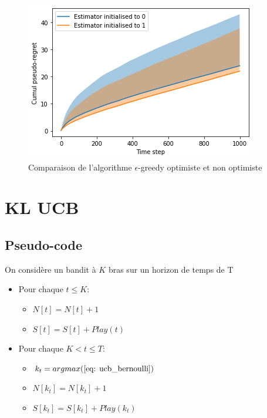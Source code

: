 \documentclass[letterpaper,11pt]{article}
\begin{document}
\begin{figure}[H]
\label{fig: no1_2}
\begin{center}
\caption{Comparaison de l'algorithme $\epsilon$-greedy optimiste et non optimiste}
\includegraphics[scale=0.8]{fig2_no1_2.png}
\end{center}
\end{figure}

\section{KL UCB}


\subsection{Pseudo-code}
On considère un bandit à $K$ bras sur un horizon de temps de T
\begin{itemize}
\setlength\itemsep{0.2cm}

\item Pour chaque $t\leq K:$

\begin{itemize}

\item $N[t] = N[t]+1$

\item $S[t] = S[t]+Play(t)$

\end{itemize}

\item Pour chaque $K < t \leq T:$

\begin{itemize}

\item $k_t = argmax(\ref{eq: ucb_bernoulli})$

\item $N[k_t] = N[k_t]+1$

\item $S[k_t] = S[k_t]+Play(k_t)$

\end{itemize}


\end{itemize}
\end{document}
